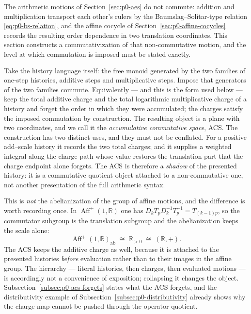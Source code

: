 The arithmetic motions of Section~\ref{sec:p0-aes} do not commute: addition and
multiplication transport each other's rulers by the Baumslag--Solitar-type
relation \eqref{eq:p0-bs-relation}, and the affine cocycle of
Section~\ref{sec:p0-affine-cocycles} records the resulting order dependence in
two translation coordinates.  This section constructs a commutativization of
that non-commutative motion, and the level at which commutation is imposed must
be stated exactly.

Take the history language itself: the free monoid generated by the two families
of one-step histories, additive steps and multiplicative steps.  Impose that
generators of the two families commute.  Equivalently --- and this is the form
used below --- keep the total additive charge and the total logarithmic
multiplicative charge of a history and forget the order in which they were
accumulated; the charges satisfy the imposed commutation by construction.  The
resulting object is a plane with two coordinates, and we call it the
\emph{accumulative commutative space}, ACS.  The construction has two distinct
uses, and they must not be conflated.  For a positive add--scale history it
records the two total charges; and it supplies a weighted integral along the
charge path whose value restores the
translation part that the charge endpoint alone forgets.  The ACS is therefore a
\emph{shadow} of
the presented history: it is a commutative quotient object attached to a
non-commutative one, not another presentation of the full arithmetic syntax.

This is \emph{not} the abelianization of the group of affine motions, and the
difference is worth recording once.  In $\operatorname{Aff}^{+}(1,\mathbb R)$
one has $D_kT_pD_k^{-1}T_p^{-1}=T_{(k-1)p}$, so the commutator subgroup is the
translation subgroup and the abelianization keeps the scale alone:
\[
  \operatorname{Aff}^{+}(1,\mathbb R)_{\mathrm{ab}}
  \;\cong\;\mathbb R_{>0}\;\cong\;(\mathbb R,+).
\]
The ACS keeps the additive charge as well, because it is attached to the
presented histories \emph{before} evaluation rather than to their images in the
affine group.  The hierarchy --- literal histories, then charges, then evaluated
motions --- is accordingly not a convenience of exposition; collapsing it
changes the object.  Subsection~\ref{subsec:p0-acs-forgets} states what the ACS
forgets, and the distributivity example of
Subsection~\ref{subsec:p0-distributivity} already shows why the charge map
cannot be pushed through the operator quotient.

